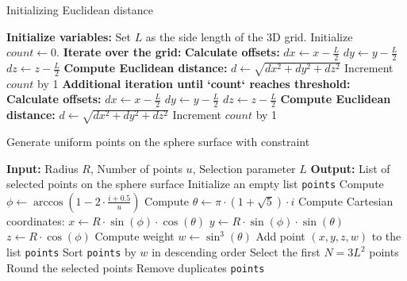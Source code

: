 \documentclass[12pt,english]{article}
\begin{document}
\begin{algorithm}
\caption{Initializing Euclidean distance}
\label{algo:initEuclid}
\begin{algorithmic}[1]
\STATE \textbf{Initialize variables:}
\STATE Set $L$ as the side length of the 3D grid.
\STATE Initialize $count \gets 0$.
\STATE \textbf{Iterate over the grid:}
            \STATE \textbf{Calculate offsets:}
            \STATE $dx \gets x - \frac{L}{2}$
            \STATE $dy \gets y - \frac{L}{2}$
            \STATE $dz \gets z - \frac{L}{2}$
            \STATE \textbf{Compute Euclidean distance:}
            \STATE $d \gets \sqrt{dx^2 + dy^2 + dz^2}$
                \STATE Increment $count$ by 1
            \ENDIF
        \ENDFOR
    \ENDFOR
\ENDFOR
\STATE \textbf{Additional iteration until `count` reaches threshold:}
                \STATE \textbf{Calculate offsets:}
                \STATE $dx \gets x - \frac{L}{2}$
                \STATE $dy \gets y - \frac{L}{2}$
                \STATE $dz \gets z - \frac{L}{2}$
                \STATE \textbf{Compute Euclidean distance:}
                \STATE $d \gets \sqrt{dx^2 + dy^2 + dz^2}$
                    \STATE Increment $count$ by 1
                \ENDIF
            \ENDFOR
        \ENDFOR
    \ENDIF
\ENDFOR
\end{algorithmic}
\end{algorithm}

\begin{algorithm}
\caption{Generate uniform points on the sphere surface with constraint}
\label{alg:generateSpherePoints}
\begin{algorithmic}[1]
\STATE \textbf{Input:} Radius $R$, Number of points $u$, Selection parameter $L$
\STATE \textbf{Output:} List of selected points on the sphere surface
\STATE Initialize an empty list \texttt{points}
    \STATE Compute $\phi \gets \arccos(1 - 2 \cdot \frac{i + 0.5}{u})$
    \STATE Compute $\theta \gets \pi \cdot (1 + \sqrt{5}) \cdot i$
    \STATE Compute Cartesian coordinates:
    \STATE \hspace{1em} $x \gets R \cdot \sin(\phi) \cdot \cos(\theta)$
    \STATE \hspace{1em} $y \gets R \cdot \sin(\phi) \cdot \sin(\theta)$
    \STATE \hspace{1em} $z \gets R \cdot \cos(\phi)$
    \STATE Compute weight $w \gets \sin^3(\theta)$
    \STATE Add point $(x, y, z, w)$ to the list \texttt{points}
\ENDFOR
\STATE Sort \texttt{points} by $w$ in descending order
\STATE Select the first $N = 3L^2$ points
\STATE Round the selected points
\STATE Remove duplicates
\RETURN \texttt{points}
\end{algorithmic}
\end{algorithm}
\end{document}
